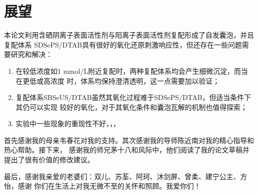\documentclass[bachelor,fandolfonts,replaceperiod]{jnuthesis}
\begin{document}
    \section{展望}
    本论文利用含硒阴离子表面活性剂与阳离子表面活性剂复配形成了自发囊泡，并且复配体系
    SDSePS/DTAB具有很好的氧化还原刺激响应性，但还存在一些问题需要研究和解决：
    \begin{enumerate}
        \item 在较低浓度如1 mmol/L附近复配时，两种复配体系均会产生细微沉淀，而当在更低或高浓度
        时，体系均保持澄清透明，这一点需要加以验证；
        \item 复配体系SBSeUS/DTAB虽然其氧化过程难于SDSePS/DTAB，但适当条件下其仍可以实现
        较好的氧化，对于其氧化条件和囊泡瓦解的机制也值得探索；
        \item 实验中一些现象的重现性不好，，，
    \end{enumerate}
    
    \begin{backmatter}
    
    \end{backmatter}

    \begin{acknowledgement}
        首先感谢我的母亲韦春花对我的支持。其次感谢我的导师陈近南对我的精心指导和热心帮助。接下来，
        感谢我的师兄茅十八和风际中，他们阅读了我的论文草稿并提出了很有价值的修改建议。
        
        最后，感谢我亲爱的老婆们：双儿、苏荃、阿珂、沐剑屏、曾柔、建宁公主、方怡，感谢
        你们在生活上对我无微不至的关怀和照顾。我爱你们！
    \end{acknowledgement}
    
\end{document}
